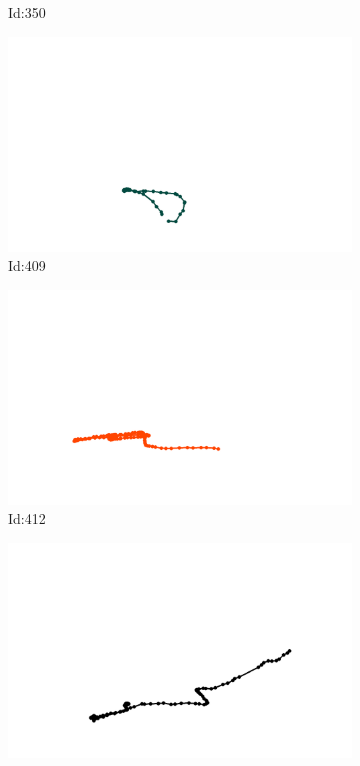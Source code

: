 \documentclass[12pt,twoside]{report}
\begin{document}
\begin{figure}
\begin{subfigure}[b]{0.20\textwidth}
\caption{Id:350}
\end{subfigure}
\begin{subfigure}[b]{0.20\textwidth}
\centering
\includegraphics[width=\textwidth]{../trajectories/409.png}
\caption{Id:409}
\end{subfigure}
\begin{subfigure}[b]{0.20\textwidth}
\centering
\includegraphics[width=\textwidth]{../trajectories/412.png}
\caption{Id:412}
\end{subfigure}
\begin{subfigure}[b]{0.20\textwidth}
\centering
\includegraphics[width=\textwidth]{../trajectories/462.png}

\end{subfigure}
\end{figure}
\end{document}
